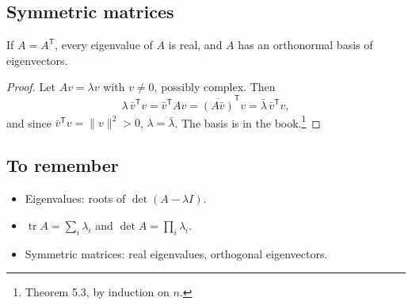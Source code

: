 \subsection{Symmetric matrices}

\begin{theorem}
If $A = A^{\mathsf{T}}$, every eigenvalue of $A$ is real, and $A$ has an orthonormal basis of eigenvectors.
\end{theorem}

\begin{proof}
Let $Av = \lambda v$ with $v \neq 0$, possibly complex. Then
\[ \lambda \, \bar{v}^{\mathsf{T}} v = \bar{v}^{\mathsf{T}} A v = \overline{(A \bar{v})}^{\mathsf{T}} v = \bar{\lambda} \, \bar{v}^{\mathsf{T}} v, \]
and since $\bar{v}^{\mathsf{T}} v = \|v\|^2 > 0$, $\lambda = \bar{\lambda}$. The basis is in the book.\footnote{Theorem 5.3, by induction on $n$.}
\end{proof}

\subsection{To remember}
\begin{itemize}
  \item Eigenvalues: roots of $\det(A - \lambda I)$.
  \item $\operatorname{tr} A = \sum_i \lambda_i$ and $\det A = \prod_i \lambda_i$.
  \item Symmetric matrices: real eigenvalues, orthogonal eigenvectors.
\end{itemize}
